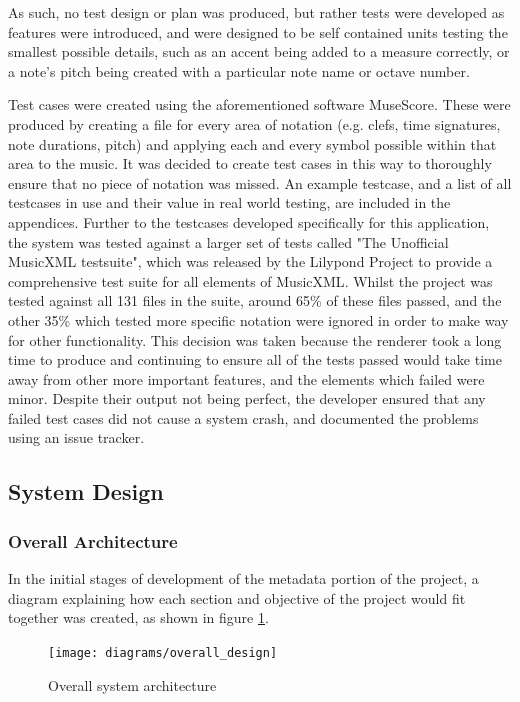 As such, no test design or plan was produced, but rather tests were developed as features were introduced, and were designed to be self contained units testing the smallest possible details, such as an accent being added to a measure correctly, or a note's pitch being created with a particular note name or octave number.

Test cases were created using the aforementioned software MuseScore. These were produced by creating a file for every area of notation (e.g. clefs, time signatures, note durations, pitch) and applying each and every symbol possible within that area to the music. It was decided to create test cases in this way to thoroughly ensure that no piece of notation was missed. An example testcase, and a list of all testcases in use and their value in real world testing, are included in the appendices.
Further to the testcases developed specifically for this application, the system was tested against a larger set of tests called "The Unofficial MusicXML testsuite", which was released by the Lilypond Project to provide a comprehensive test suite for all elements of MusicXML\parencite{LilypondTestcase}. 
Whilst the project was tested against all 131 files in the suite, around 65\% of these files passed, and the other 35\% which tested more specific notation were ignored in order to make way for other functionality. This decision was taken because the renderer took a long time to produce and continuing to ensure all of the tests passed would take time away from other more important features, and the elements which failed were minor. Despite their output not being perfect, the developer ensured that any failed test cases did not cause a system crash, and documented the problems using an issue tracker.
\subsection{System Design}
\subsubsection{Overall Architecture}
In the initial stages of development of the metadata portion of the project, a diagram explaining how each section and objective of the project would fit together was created, as shown in figure \ref{fig:projectstructure}. 
\begin{figure}[H]
    \centering
    \texttt{[image: diagrams/overall\_design]}
    \caption{Overall system architecture}
    \label{fig:projectstructure}
\end{figure}
